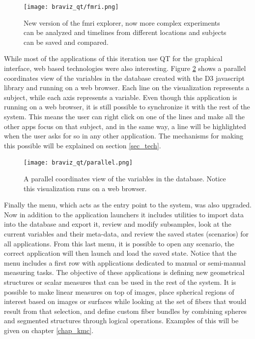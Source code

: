 \begin{figure}
\centering
\texttt{[image: braviz\_qt/fmri.png]}
\caption{\label{fig_fmri_2}New version of the fmri explorer, now more complex experiments can be analyzed and timelines from different locations and subjects can be saved and compared.}
\end{figure}

While most of the applications of this iteration use QT for the graphical interface, web based technologies were also interesting. Figure \ref{fig_parallel_2} shows a parallel coordinates view of the variables in the database created with the D3 \autocite{bostock_d3_2011} javascript library and running on a web browser. Each line on the visualization represents a subject, while each axis represents a variable. Even though this application is running on a web browser, it is still possible to synchronize it with the rest of the system. This means the user can right click on one of the lines and make all the other apps focus on that subject, and in the same way, a line will be highlighted when the user asks for so in any other application. The mechanisms for making this possible will be explained on section \ref{sec_tech}.

\begin{figure}
\centering
\texttt{[image: braviz\_qt/parallel.png]}
\caption{\label{fig_parallel_2}A parallel coordinates view of the variables in the database. Notice this visualization runs on a web browser.}
\end{figure}

Finally the menu, which acts as the entry point to the system, was also upgraded. Now in addition to the application launchers it includes utilities to import data into the database and export it, review and modify subsamples, look at the current variables and their meta-data, and review the saved states (scenarios) for all applications. From this last menu, it is possible to open any scenario, the correct application will then launch and load the saved state. Notice that the menu includes a first row with applications dedicated to manual or semi-manual measuring tasks. The objective of these applications is defining new geometrical structures or scalar measures that can be used in the rest of the system. It is possible to make linear measures on top of images, place spherical regions of interest based on images or surfaces while looking at the set of fibers that would result from that selection, and define custom fiber bundles by combining spheres and segmented structures through logical operations. Examples of this will be given on chapter \ref{chap_kmc}.

